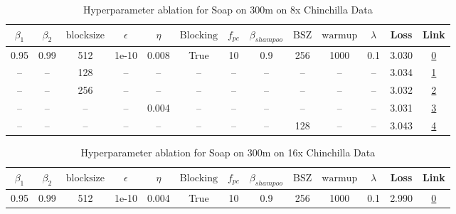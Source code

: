 \begin{table}[H]
\centering
\caption{Hyperparameter ablation for Soap on 300m on 8x Chinchilla Data}
\label{tab:ablation_soap_300m_8}
\begin{tabular}{ccccccccccccc}
\toprule
$\beta_1$ & $\beta_2$ & $\mathrm{block size}$ & $\epsilon$ & $\eta$ & $\mathrm{Blocking}$ & $f_{pc}$ & $\beta_{shampoo}$ & $\mathrm{BSZ}$ & $\mathrm{warmup}$ & $\lambda$ & Loss & Link \\
\midrule
0.95 & 0.99 & 512 & 1e-10 & 0.008 & True & 10 & 0.9 & 256 & 1000 & 0.1 & 3.030 & \href{https://wandb.ai/stanford-mercury/optimizer-scaling/runs/sweep-300m-48B-soapeae57080lr0.008-wd0.1-minlr0-warmup1000-b10.9-f53d36}{0} \\
\midrule
-- & -- & 128 & -- & -- & -- & -- & -- & -- & -- & -- & 3.034 & \href{https://wandb.ai/stanford-mercury/optimizer-scaling/runs/sweep-300m-48B-soape98b16alr0.008-wd0.1-minlr0-warmup1000-b10.95-76e70a}{1} \\
-- & -- & 256 & -- & -- & -- & -- & -- & -- & -- & -- & 3.032 & \href{https://wandb.ai/stanford-mercury/optimizer-scaling/runs/sweep-300m-48B-soapec59568lr0.008-wd0.1-minlr0-warmup1000-b10.95-dc6b11}{2} \\
-- & -- & -- & -- & 0.004 & -- & -- & -- & -- & -- & -- & 3.031 & \href{https://wandb.ai/stanford-mercury/optimizer-scaling/runs/sweep-300m-48B-soape9f5a41lr0.004-wd0.1-minlr0-warmup1000-b10.95-c462c4}{3} \\
-- & -- & -- & -- & -- & -- & -- & -- & 128 & -- & -- & 3.043 & \href{https://wandb.ai/stanford-mercury/optimizer-scaling/runs/sweep-300m-48B-soapea631a39lr0.008-wd0.1-minlr0-warmup1000-b10.9-9b5fd4}{4} \\
\bottomrule
\end{tabular}
\end{table}

\begin{table}[H]
\centering
\caption{Hyperparameter ablation for Soap on 300m on 16x Chinchilla Data}
\label{tab:ablation_soap_300m_16}
\begin{tabular}{ccccccccccccc}
\toprule
$\beta_1$ & $\beta_2$ & $\mathrm{block size}$ & $\epsilon$ & $\eta$ & $\mathrm{Blocking}$ & $f_{pc}$ & $\beta_{shampoo}$ & $\mathrm{BSZ}$ & $\mathrm{warmup}$ & $\lambda$ & Loss & Link \\
\midrule
0.95 & 0.99 & 512 & 1e-10 & 0.004 & True & 10 & 0.9 & 256 & 1000 & 0.1 & 2.990 & \href{https://wandb.ai/stanford-mercury/optimizer-scaling/runs/sweep-300m-96B-soapef479bb0lr0.004-wd0.1-minlr0-warmup1000-b10.9-ef8190}{0} \\
\midrule
\bottomrule
\end{tabular}
\end{table}

